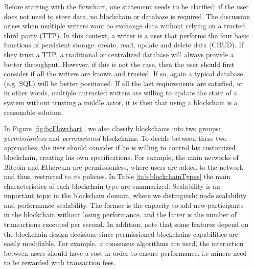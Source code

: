 Before starting with the flowchart, one statement needs to be clarified: if the user does not need to store data, no blockchain or database is required. The discussion arises when multiple writers want to exchange data without relying on a trusted third party (TTP). In this context, a writer is a user that performs the four basic functions of persistent storage: create, read, update and delete data (CRUD). If they trust a TTP, a traditional or centralized database will always provide a better throughput. However, if this is not the case, then the user should first consider if all the writers are known and trusted. If so, again a typical database (e.g. SQL) will be better positioned. If all the last requirements are satisfied, or in other words, multiple untrusted writers are willing to update the state of a system without trusting a middle actor, it is then that using a blockchain is a reasonable solution.

In Figure \ref{fig:bcFlowchart}, we also classify blockchains into two groups: \textit{permissionless} and \textit{permissioned} blockchains. To decide between these two approaches, the user should consider if he is willing to control his customized blockchain, creating his own specifications. For example, the main networks of Bitcoin and Ethereum are permissionless, where users are added to the network and thus, restricted to its policies. In Table \ref{tab:blockchainTypes} the main characteristics of each blockchain type are summarized. Scalability is an important topic in the blockchain domain, where we distinguish: node scalability and performance scalability. The former is the capacity to add new participants in the blockchain without losing performance, and the latter is the number of transactions executed per second. In addition, note that some features depend on the blockchain design decisions since permissioned blockchains capabilities are easily modifiable. For example, if consensus algorithms are used, the interaction between users should have a cost in order to ensure performance, i.e miners need to be rewarded with transaction fees.

